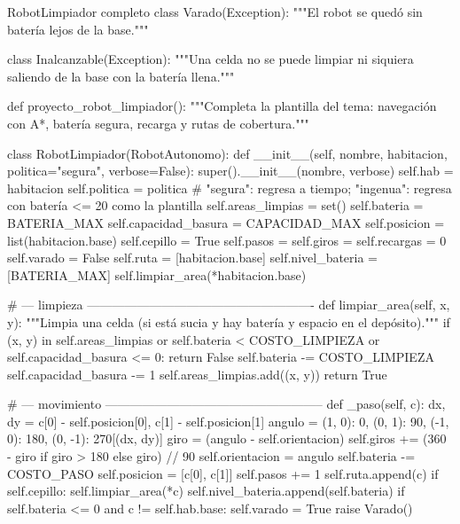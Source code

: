 \documentclass[11pt,letterpaper]{article}
\begin{document}
\begin{codigo}[label=cod:robot]{RobotLimpiador completo}
class Varado(Exception):
    """El robot se quedó sin batería lejos de la base."""


class Inalcanzable(Exception):
    """Una celda no se puede limpiar ni siquiera saliendo de la base con la batería llena."""


def proyecto_robot_limpiador():
    """Completa la plantilla del tema: navegación con A*, batería segura, recarga y rutas de cobertura."""

    class RobotLimpiador(RobotAutonomo):
        def __init__(self, nombre, habitacion, politica="segura", verbose=False):
            super().__init__(nombre, verbose)
            self.hab = habitacion
            self.politica = politica            # "segura": regresa a tiempo; "ingenua": regresa con batería <= 20 como la plantilla
            self.areas_limpias = set()
            self.bateria = BATERIA_MAX
            self.capacidad_basura = CAPACIDAD_MAX
            self.posicion = list(habitacion.base)
            self.cepillo = True
            self.pasos = self.giros = self.recargas = 0
            self.varado = False
            self.ruta = [habitacion.base]
            self.nivel_bateria = [BATERIA_MAX]
            self.limpiar_area(*habitacion.base)

        # --- limpieza -------------------------------------------------------
        def limpiar_area(self, x, y):
            """Limpia una celda (si está sucia y hay batería y espacio en el depósito)."""
            if (x, y) in self.areas_limpias or self.bateria < COSTO_LIMPIEZA or self.capacidad_basura <= 0:
                return False
            self.bateria -= COSTO_LIMPIEZA
            self.capacidad_basura -= 1
            self.areas_limpias.add((x, y))
            return True

        # --- movimiento -----------------------------------------------------
        def _paso(self, c):
            dx, dy = c[0] - self.posicion[0], c[1] - self.posicion[1]
            angulo = {(1, 0): 0, (0, 1): 90, (-1, 0): 180, (0, -1): 270}[(dx, dy)]
            giro = (angulo - self.orientacion) %
            self.giros += (360 - giro if giro > 180 else giro) // 90
            self.orientacion = angulo
            self.bateria -= COSTO_PASO
            self.posicion = [c[0], c[1]]
            self.pasos += 1
            self.ruta.append(c)
            if self.cepillo:
                self.limpiar_area(*c)
            self.nivel_bateria.append(self.bateria)
            if self.bateria <= 0 and c != self.hab.base:
                self.varado = True
                raise Varado()


\end{codigo}
\end{document}
